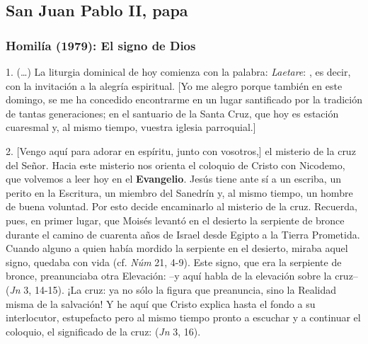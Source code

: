 \newsection
\subsection{San Juan Pablo II, papa}

\subsubsection{Homilía (1979): El signo de Dios}


\begin{body}
1. (\ldots) La liturgia dominical de hoy comienza con la palabra: \textit{Laetare}: , es decir, con la invitación a la alegría espiritual. [Yo me alegro porque también en este domingo, se me ha concedido encontrarme en un lugar santificado por la tradición de tantas generaciones; en el santuario de la Santa Cruz, que hoy es estación cuaresmal y, al mismo tiempo, vuestra iglesia parroquial.]

2. [Vengo aquí para adorar en espíritu, junto con vosotros,] el misterio de la cruz del Señor. Hacia este misterio nos orienta el coloquio de Cristo con Nicodemo, que volvemos a leer hoy en el \textbf{Evangelio}. Jesús tiene ante sí a un escriba, un perito en la Escritura, un miembro del Sanedrín y, al mismo tiempo, un hombre de buena voluntad. Por esto decide encaminarlo al misterio de la cruz. Recuerda, pues, en primer lugar, que Moisés levantó en el desierto la serpiente de bronce durante el camino de cuarenta años de Israel desde Egipto a la Tierra Prometida. Cuando alguno a quien había mordido la serpiente en el desierto, miraba aquel signo, quedaba con vida (cf. \textit{Núm} 21, 4-9). Este signo, que era la serpiente de bronce, preanunciaba otra Elevación:  –y aquí habla de la elevación sobre la cruz–  (\textit{Jn} 3, 14-15). ¡La cruz: ya no sólo la figura que preanuncia, sino la Realidad misma de la salvación! Y he aquí que Cristo explica hasta el fondo a su interlocutor, estupefacto pero al mismo tiempo pronto a escuchar y a continuar el coloquio, el significado de la cruz:  (\textit{Jn} 3, 16).


\end{body}
